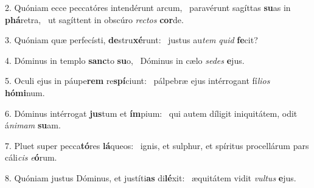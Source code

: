 2. Quóniam ecce peccatóres intendérunt arcum, \dag\  paravérunt sagíttas \textbf{su}as in \textbf{phá}retra, \ast\  ut sagíttent in obscúro \textit{rec}\textit{tos} \textbf{cor}de.\

3. Quóniam quæ perfecísti, \textbf{de}stru\textbf{xé}runt: \ast\  justus au\textit{tem} \textit{quid} \textbf{fe}cit?\

4. Dóminus in templo \textbf{sanc}to \textbf{su}o, \ast\  Dóminus in cælo \textit{se}\textit{des} \textbf{e}jus.\

5. Oculi ejus in páupe\textbf{rem} re\textbf{spí}ciunt: \ast\  pálpebræ ejus intérrogant fí\textit{li}\textit{os} \textbf{hó}\textbf{mi}num.\

6. Dóminus intérrogat \textbf{jus}tum et \textbf{ím}pium: \ast\  qui autem díligit iniquitátem, odit á\textit{ni}\textit{mam} \textbf{su}am.\

7. Pluet super pecca\textbf{tó}res \textbf{lá}queos: \ast\  ignis, et sulphur, et spíritus procellárum pars cáli\textit{cis} \textit{e}\textbf{ó}rum.\

8. Quóniam justus Dóminus, et justíti\textbf{as} di\textbf{lé}xit: \ast\  æquitátem vidit \textit{vul}\textit{tus} \textbf{e}jus.\

